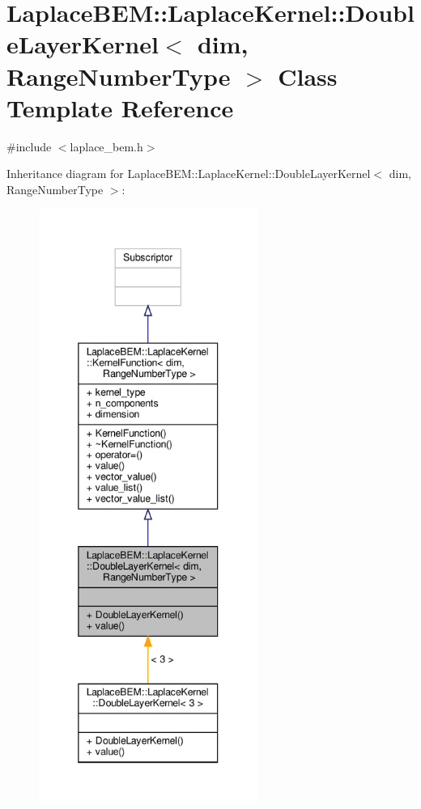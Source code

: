 \hypertarget{classLaplaceBEM_1_1LaplaceKernel_1_1DoubleLayerKernel}{}\section{Laplace\+B\+EM\+:\+:Laplace\+Kernel\+:\+:Double\+Layer\+Kernel$<$ dim, Range\+Number\+Type $>$ Class Template Reference}
\label{classLaplaceBEM_1_1LaplaceKernel_1_1DoubleLayerKernel}


{\ttfamily \#include $<$laplace\+\_\+bem.\+h$>$}



Inheritance diagram for Laplace\+B\+EM\+:\+:Laplace\+Kernel\+:\+:Double\+Layer\+Kernel$<$ dim, Range\+Number\+Type $>$\+:\nopagebreak
\begin{figure}[H]
\begin{center}
\leavevmode
\includegraphics[height=550pt]{classLaplaceBEM_1_1LaplaceKernel_1_1DoubleLayerKernel__inherit__graph}
\end{center}
\end{figure}


